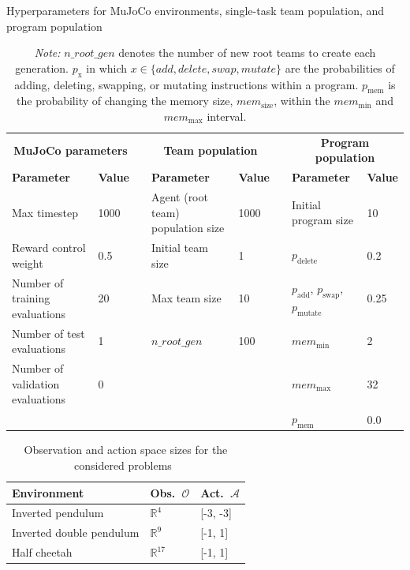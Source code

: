 \documentclass[sigconf]{acmart}
\begin{document}
\begin{table}
  \caption{Hyperparameters for MuJoCo environments, single-task team population, and program population}\label{tab:hyperparameters}
  \centering
  \begin{tabular}{llcllcll}
    \toprule
    \multicolumn{2}{c}{\textbf{MuJoCo parameters}} & & \multicolumn{2}{c}{\textbf{Team population}} & & \multicolumn{2}{c}{\textbf{Program population}} \\
    \cmidrule(r){1-2} \cmidrule(lr){4-5} \cmidrule(l){7-8}
    \textbf{Parameter} & \textbf{Value} & & \textbf{Parameter} & \textbf{Value} & & \textbf{Parameter} & \textbf{Value} \\
    \midrule
    Max timestep & 1000 & & Agent (root team) population size & 1000 & & Initial program size & 10 \\
    Reward control weight & 0.5 & & Initial team size & 1 & & $p_\text{delete}$ & 0.2 \\
    Number of training evaluations & 20 & & Max team size & 10 & & $p_\text{add}$, $p_\text{swap}$, $p_\text{mutate}$ & 0.25 \\
    Number of test evaluations & 1 & & $n\_root\_gen$ & 100 & & $mem_\text{min}$ & 2 \\
    Number of validation evaluations & 0 & & & & & $mem_\text{max}$ & 32 \\
    & & & & & & $p_\text{mem}$ & 0.0 \\
    \bottomrule
  \end{tabular}
  \caption*{\small \textit{Note:} $n\_root\_gen$ denotes the number of new root teams to create each generation. $p_\text{x}$ in which $x \in \{add, delete, swap, mutate\}$ are the probabilities of adding, deleting, swapping, or mutating instructions within a program. $p_\text{mem}$ is the probability of changing the memory size, $mem_\text{size}$, within the $mem_\text{min}$ and $mem_\text{max}$ interval.}
\end{table}

\begin{table}
  \caption{Observation and action space sizes for the considered problems~\cite{FaramaFoundation24}}\label{tab:observation_space}
  \begin{tabular}{lll}
    \toprule
    \textbf{Environment}&\textbf{Obs.}~$\mathcal{O}$&\textbf{Act.}~$\mathcal{A}$\\
    \midrule
    Inverted pendulum & $\mathbb{R}^4$ & [-3, -3]\\
    Inverted double pendulum & $\mathbb{R}^9$ & [-1, 1]\\
    Half cheetah & $\mathbb{R}^{17}$ & [-1, 1]\\
  \bottomrule
\end{tabular}
\end{table}
\end{document}
